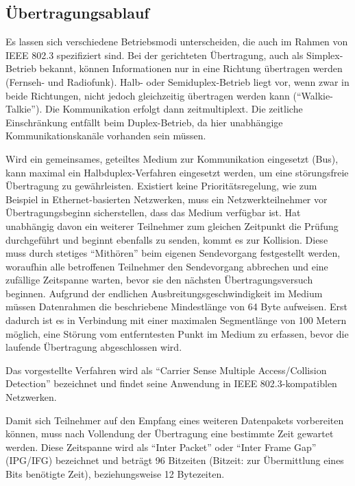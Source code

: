 \subsection{Übertragungsablauf}
\label{sec:grundlagen_ethernet_funktionsweise}
\label{sec:grundlagen_ethernet_kommunikationsablauf}
Es lassen sich verschiedene Betriebsmodi unterscheiden, die auch im
Rahmen von IEEE 802.3 spezifiziert sind.
Bei der gerichteten Übertragung, auch als Simplex-Betrieb bekannt,
können Informationen nur in eine Richtung übertragen werden (Fernseh-
und Radiofunk). Halb- oder Semiduplex-Betrieb liegt vor, wenn zwar in
beide Richtungen, nicht jedoch gleichzeitig übertragen werden kann
(``Walkie-Talkie''). Die Kommunikation erfolgt dann
zeitmultiplext. Die zeitliche Einschränkung entfällt beim
Duplex-Betrieb, da hier unabhängige Kommunikationskanäle vorhanden
sein müssen.

Wird ein gemeinsames, geteiltes Medium zur Kommunikation eingesetzt
(Bus), kann maximal ein Halbduplex-Verfahren eingesetzt werden, um
eine störungsfreie Übertragung zu gewährleisten. Existiert keine
Prioritätsregelung, wie zum Beispiel in Ethernet-basierten Netzwerken,
muss ein Netzwerkteilnehmer vor Übertragungsbeginn sicherstellen, dass
das Medium verfügbar ist. Hat unabhängig davon ein weiterer Teilnehmer
zum gleichen Zeitpunkt die Prüfung durchgeführt und beginnt ebenfalls
zu senden, kommt es zur Kollision. Diese muss durch stetiges
``Mithören'' beim eigenen Sendevorgang festgestellt werden, woraufhin
alle betroffenen Teilnehmer den Sendevorgang abbrechen und eine
zufällige Zeitspanne warten, bevor sie den nächsten
Übertragungsversuch beginnen. Aufgrund der endlichen
Ausbreitungsgeschwindigkeit im Medium müssen Datenrahmen die
beschriebene Mindestlänge von 64 Byte aufweisen. Erst dadurch ist es in Verbindung mit einer maximalen Segmentlänge von 100 Metern möglich, eine Störung vom entferntesten Punkt im Medium zu erfassen,
bevor die laufende Übertragung abgeschlossen wird.

Das vorgestellte Verfahren wird als ``Carrier Sense Multiple
Access/Collision Detection'' bezeichnet und findet seine Anwendung in
IEEE 802.3-kompatiblen Netzwerken.

Damit sich Teilnehmer auf den Empfang eines weiteren Datenpakets
vorbereiten können, muss nach Vollendung der Übertragung eine
bestimmte Zeit gewartet werden. Diese Zeitspanne wird als ``Inter
Packet'' oder ``Inter Frame Gap'' (IPG/IFG) bezeichnet und beträgt 96
Bitzeiten (Bitzeit: zur Übermittlung eines Bits benötigte Zeit),
beziehungsweise 12 Bytezeiten.

